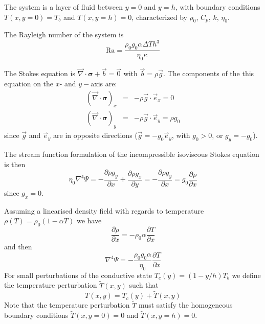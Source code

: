 

The system is a layer of fluid between $y=0$ and $y=h$, with boundary conditions $T(x,y=0)=T_b$ 
and $T(x,y=h)=0$, characterized by $\rho_0$, $C_p$, $k$, $\eta_0$. 

The Rayleigh number of the system is 
\[
\text{Ra}= \frac{\rho_0 g_0 \alpha \Delta T h^3}{\eta_0 \kappa}
\]

The Stokes equation is $\vec \nabla \cdot \bm \sigma + \vec b = \vec 0$ with $\vec b=\rho \vec g$. 
The components of the this equation on the $x$- and $y-$axis are:
\begin{eqnarray}
(\vec \nabla \cdot \bm \sigma)_x &=& - \rho \vec g \cdot \vec e_x = 0\\ 
(\vec \nabla \cdot \bm \sigma)_y &=& - \rho \vec g \cdot \vec e_y = \rho g_0
\end{eqnarray}
since $\vec g$ and $\vec e_y$ are in opposite directions ($\vec g = - g_0 \vec e_y$, with $g_0>0$, 
or $g_y=-g_0$).

The stream function formulation of the incompressible isoviscous Stokes equation is then
\[
\eta_0 \nabla^4 \Psi
= -\frac{\partial \rho g_y}{\partial x} + \frac{\partial \rho g_x}{\partial y}   
= -\frac{\partial \rho g_y}{\partial x} 
=  g_0 \frac{\partial \rho}{\partial x} 
\]
since $g_x=0$. 

Assuming a linearised density field with regards to temperature $\rho(T)=\rho_0 (1-\alpha T)$
we have 
\[
\frac{\partial \rho}{\partial x} 
=
-\rho_0 \alpha \frac{\partial T}{\partial x} 
\]
and then 
\begin{equation}
\boxed{
\nabla^4 \Psi= -\frac{\rho_0 g_0 \alpha}{\eta_0} \frac{\partial T}{\partial x} 
}
\end{equation}
For small perturbations of the conductive state $T_c(y)=(1-y/h)T_b$ 
we define the temperature perturbation $\tilde{T}(x,y)$ such that 
\[
T(x,y)=T_c(y)+\tilde{T}(x,y)
\]
Note that the temperature perturbation $\tilde{T}$ must satisfy the homogeneous boundary 
conditions $\tilde{T}(x,y=0)=0$ and $\tilde{T}(x,y=h)=0$.

